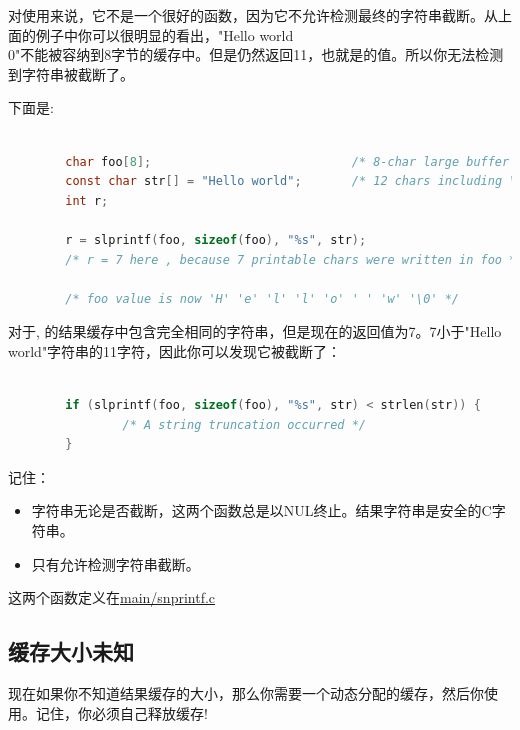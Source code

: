 对使用来说，它不是一个很好的函数，因为它不允许检测最终的字符串截断。从上面的例子中你可以很明显的看出，"Hello world\\0"不能被容纳到8字节的缓存中。但是仍然返回11，也就是的值。所以你无法检测到字符串被截断了。

下面是:

\begin{lstlisting}[language=c]

        char foo[8];                            /* 8-char large buffer */
        const char str[] = "Hello world";       /* 12 chars including \0 in count */
        int r;
        
        r = slprintf(foo, sizeof(foo), "%s", str);
        /* r = 7 here , because 7 printable chars were written in foo */
        
        /* foo value is now 'H' 'e' 'l' 'l' 'o' ' ' 'w' '\0' */

\end{lstlisting}         


对于, 的结果缓存中包含完全相同的字符串，但是现在的返回值为7。7小于"Hello world"字符串的11字符，因此你可以发现它被截断了：

\begin{lstlisting}[language=c]

        if (slprintf(foo, sizeof(foo), "%s", str) < strlen(str)) {
                /* A string truncation occurred */
        }

\end{lstlisting} 

记住：

\begin{itemize}
        \item 字符串无论是否截断，这两个函数总是以NUL终止。结果字符串是安全的C字符串。
        \item 只有允许检测字符串截断。
\end{itemize}  


这两个函数定义在\href{https://github.com/php/php-src/blob/648be8600ff89e1b0e4a4ad25cebad42b53bed6d/main/snprintf.c}{main/snprintf.c}


\subsection{缓存大小未知}

现在如果你不知道结果缓存的大小，那么你需要一个动态分配的缓存，然后你使用。记住，你必须自己释放缓存!

